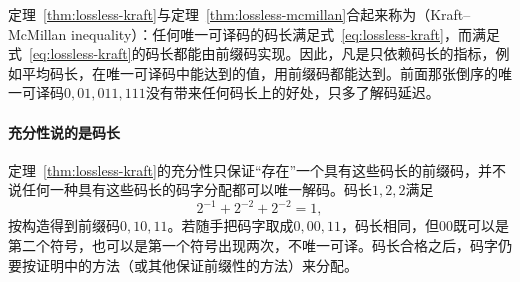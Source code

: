 定理~\ref{thm:lossless-kraft}与定理~\ref{thm:lossless-mcmillan}合起来称为（Kraft–McMillan inequality）：任何唯一可译码的码长满足式~\eqref{eq:lossless-kraft}，而满足式~\eqref{eq:lossless-kraft}的码长都能由前缀码实现。因此，凡是只依赖码长的指标，例如平均码长，在唯一可译码中能达到的值，用前缀码都能达到。前面那张倒序的唯一可译码$0,01,011,111$没有带来任何码长上的好处，只多了解码延迟。

\paragraph{充分性说的是码长}
定理~\ref{thm:lossless-kraft}的充分性只保证“存在”一个具有这些码长的前缀码，并不说任何一种具有这些码长的码字分配都可以唯一解码。码长$1,2,2$满足
\[
 2^{-1}+2^{-2}+2^{-2}=1 ,
\]
按构造得到前缀码$0,10,11$。若随手把码字取成$0,00,11$，码长相同，但$00$既可以是第二个符号，也可以是第一个符号出现两次，不唯一可译。码长合格之后，码字仍要按证明中的方法（或其他保证前缀性的方法）来分配。
